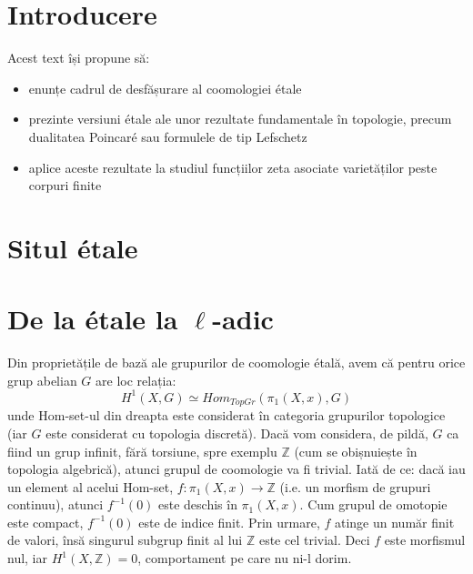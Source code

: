 \documentclass[13pt,openany]{book}
\begin{document}
\chapter{Introducere}

Acest text își propune să:

\begin{itemize}
\item enunțe cadrul de desfășurare al coomologiei étale
\item prezinte versiuni étale ale unor rezultate fundamentale în topologie, precum dualitatea Poincaré sau formulele de tip Lefschetz
\item aplice aceste rezultate la studiul funcțiilor zeta asociate varietăților peste corpuri finite
\end{itemize}

\newpage
\phantom{X}
\newpage

\pagestyle{headings}
\setcounter{secnumdepth}{2}

\chapter{Situl étale}
\setcounter{page}{1}

\chapter{De la étale la \texorpdfstring{$\ell$}{l}-adic}

Din proprietățile de bază ale grupurilor de coomologie étală, avem că pentru orice grup abelian $G$ are loc relația:
$$H^1(X,G)\simeq Hom_{TopGr}(\pi_1(X,x),G)$$
unde Hom-set-ul din dreapta este considerat în categoria grupurilor topologice (iar $G$ este considerat cu topologia discretă). Dacă vom considera, de pildă, $G$ ca fiind un grup infinit, fără torsiune, spre exemplu $\mathbb{Z}$ (cum se obișnuiește în topologia algebrică), atunci grupul de coomologie va fi trivial. Iată de ce: dacă iau un element al acelui Hom-set, $f: \pi_1(X,x) \rightarrow \mathbb{Z}$ (i.e. un morfism de grupuri continuu), atunci $f^{-1}(0)$ este deschis în $\pi_1(X,x)$. Cum grupul de omotopie este compact, $f^{-1}(0)$ este de indice finit. Prin urmare, $f$ atinge un număr finit de valori, însă singurul subgrup finit al lui $\mathbb{Z}$ este cel trivial. Deci $f$ este morfismul nul, iar $H^1(X,\mathbb{Z})=0$, comportament pe care nu ni-l dorim.
\end{document}
